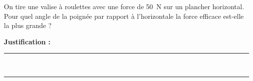 On tire une valise à roulettes avec une force de \qty{50}{N} sur un plancher horizontal. Pour quel angle de la poignée par rapport à l'horizontale la force efficace est-elle la plus grande ?

\choices

\noindent\textbf{Justification :} \hrulefill \\[2.5ex]
\rule{\linewidth}{0.4pt} \\[2.5ex]
\rule{\linewidth}{0.4pt}
\vfill
